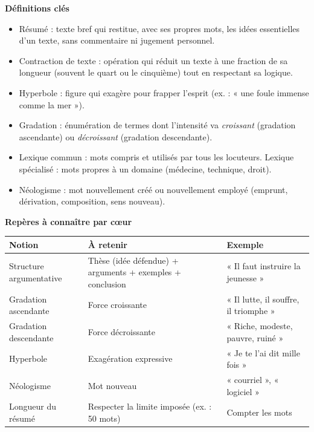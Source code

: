 \documentclass[11pt]{article}
\newcommand{\cle}[1]{{\popxbold\color{popdark}#1}}
\begin{document}
\begin{bilan}
\textbf{Définitions clés}
\begin{itemize}
  \item \cle{Résumé} : texte bref qui restitue, avec ses propres mots, les idées essentielles d'un texte, sans commentaire ni jugement personnel.
  \item \cle{Contraction de texte} : opération qui réduit un texte à une fraction de sa longueur (souvent le quart ou le cinquième) tout en respectant sa logique.
  \item \cle{Hyperbole} : figure qui exagère pour frapper l'esprit (ex. : « une foule immense comme la mer »).
  \item \cle{Gradation} : énumération de termes dont l'intensité va \emph{croissant} (gradation ascendante) ou \emph{décroissant} (gradation descendante).
  \item \cle{Lexique commun} : mots compris et utilisés par tous les locuteurs. \cle{Lexique spécialisé} : mots propres à un domaine (médecine, technique, droit).
  \item \cle{Néologisme} : mot nouvellement créé ou nouvellement employé (emprunt, dérivation, composition, sens nouveau).
\end{itemize}

\textbf{Repères à connaître par cœur}
\begin{center}
\begin{tabularx}{\linewidth}{|l|X|X|}
\hline
\rowcolor{popblueL} \textbf{Notion} & \textbf{À retenir} & \textbf{Exemple} \\
\hline
Structure argumentative & Thèse (idée défendue) + arguments + exemples + conclusion & « Il faut instruire la jeunesse » \\
\hline
Gradation ascendante & Force croissante & « Il lutte, il souffre, il triomphe » \\
\hline
Gradation descendante & Force décroissante & « Riche, modeste, pauvre, ruiné » \\
\hline
Hyperbole & Exagération expressive & « Je te l'ai dit mille fois » \\
\hline
Néologisme & Mot nouveau & « courriel », « logiciel » \\
\hline
Longueur du résumé & Respecter la limite imposée (ex. : 50 mots) & Compter les mots \\
\hline
\end{tabularx}
\end{center}


\end{bilan}
\end{document}
